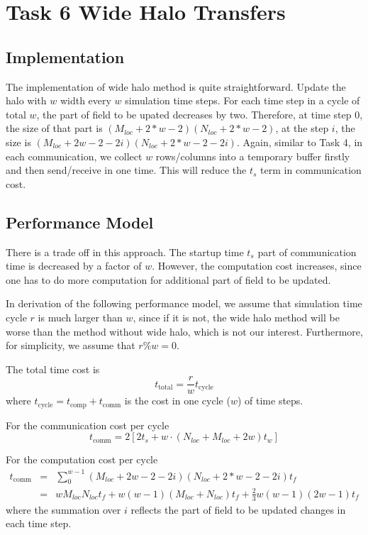 \section{Task 6 Wide Halo Transfers}

\subsection{Implementation}
The implementation of wide halo method is quite straightforward. Update the halo with $w$ width every $w$ simulation time steps. 
For each time step in a cycle of total $w$, the part of field to be upated decreases by two.
Therefore, at time step $0$, the size of that part is $(M_{loc}+2*w-2)(N_{loc}+2*w-2)$, at the step $i$, the size is 
$(M_{loc}+2w-2-2i)(N_{loc}+2*w-2-2i)$.
Again, similar to Task 4, in each communication,
we collect $w$ rows/columns into a temporary buffer firstly and then send/receive in one time. This will reduce the $t_s$ term
in communication cost.

\subsection{Performance Model}
There is a trade off in this approach. The startup time $t_s$ part of communication time is decreased by a factor of $w$. However,
the computation cost increases, since one has to do more computation for additional part of field to be updated.

In derivation of the following performance model, we assume that simulation time cycle $r$ is much larger than $w$,
since if it is not, the wide halo method will be worse than the method without wide halo, which is not our interest.
Furthermore, for simplicity, we assume that $r \% w = 0$.

The total time cost is 
\[
	t_{\textrm{total}} = \frac{r}{w} t_{\textrm{cycle}}
\]
where $t_{\textrm{cycle}}= t_{\textrm{comp}} + t_{\textrm{comm}}$ is the cost in one cycle ($w$) of time steps.

For the communication cost per cycle
\[
	t_{\textrm{comm}} = 2 \left[ 2 t_s + w\cdot \left( N_{loc} + M_{loc} + 2 w \right) t_w  \right]
\]

For the computation cost per cycle
\begin{eqnarray*}
	t_{\textrm{comm}} &=& \sum^{w-1}_{0} (M_{loc}+2w-2-2i)(N_{loc}+2*w-2-2i) t_f \\
	&=& w M_{loc} N_{loc} t_f + w(w-1) (M_{loc}+N_{loc}) t_f + \frac{2}{3} w (w-1) (2w-1) t_f
\end{eqnarray*}
where the summation over $i$ reflects the part of field to be updated changes in each time step.

